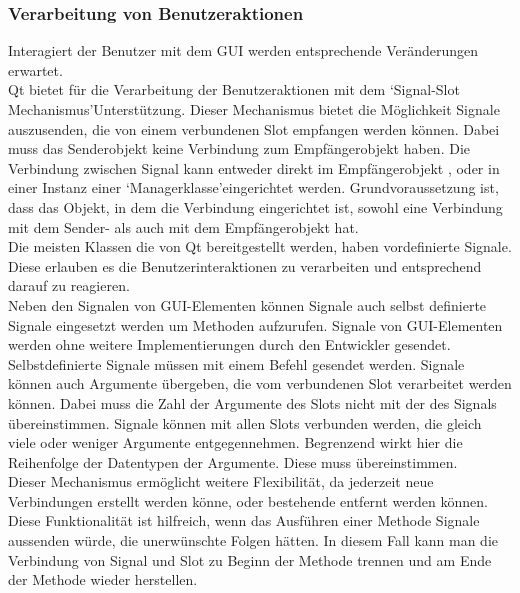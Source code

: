 \documentclass[12pt,a4paper]{article}
\begin{document}
\subsubsection{Verarbeitung von Benutzeraktionen}
Interagiert der Benutzer mit dem GUI werden entsprechende Veränderungen erwartet. \\
Qt bietet für die Verarbeitung der Benutzeraktionen mit dem \lq Signal-Slot Mechanismus\rq\space Unterstützung. Dieser Mechanismus bietet die Möglichkeit Signale auszusenden, die von einem verbundenen Slot empfangen werden können. Dabei muss das Senderobjekt keine Verbindung zum Empfängerobjekt haben. Die Verbindung zwischen Signal kann entweder direkt im Empfängerobjekt , oder in einer Instanz einer \lq Managerklasse\rq\space eingerichtet werden. Grundvoraussetzung ist, dass das Objekt, in dem die Verbindung eingerichtet ist, sowohl eine Verbindung mit dem Sender- als auch mit dem Empfängerobjekt hat.\\
Die meisten Klassen die von Qt bereitgestellt werden, haben vordefinierte Signale. Diese erlauben es die Benutzerinteraktionen zu verarbeiten und entsprechend darauf zu reagieren. \\
Neben den Signalen von GUI-Elementen können Signale auch selbst definierte Signale eingesetzt werden um Methoden aufzurufen. Signale von GUI-Elementen werden ohne weitere Implementierungen durch den Entwickler gesendet. Selbstdefinierte Signale müssen mit einem Befehl gesendet werden. Signale können auch Argumente übergeben, die vom verbundenen Slot verarbeitet werden können. Dabei muss die Zahl der Argumente des Slots nicht mit der des Signals übereinstimmen. Signale können mit allen Slots verbunden werden, die gleich viele oder weniger Argumente entgegennehmen. Begrenzend wirkt hier die Reihenfolge der Datentypen der Argumente. Diese muss übereinstimmen.\\
Dieser Mechanismus ermöglicht weitere Flexibilität, da jederzeit neue Verbindungen erstellt werden könne, oder bestehende entfernt werden können. Diese Funktionalität ist hilfreich, wenn das Ausführen einer Methode Signale aussenden würde, die unerwünschte Folgen hätten. In diesem Fall kann man die Verbindung von Signal und Slot zu Beginn der Methode trennen und am Ende der Methode wieder herstellen. \\
\end{document}
